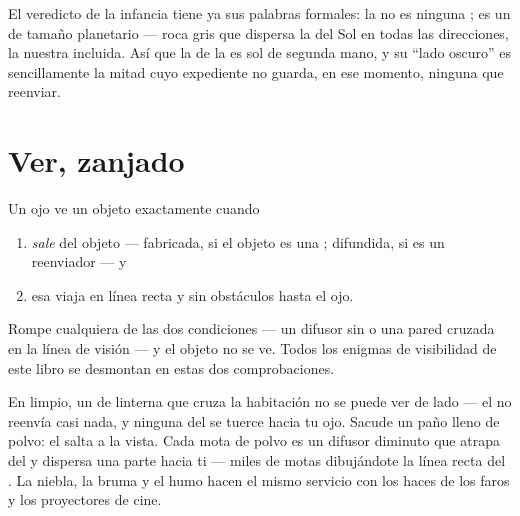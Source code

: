 \begin{example}\label{ex:g7:light-sources-propagation:moon}
El veredicto de la infancia tiene ya sus palabras formales: la
 no es ninguna ; es un
 de tamaño planetario --- roca gris que dispersa la
 del Sol en todas las direcciones, la nuestra incluida. Así que la
 de la  es sol de segunda mano, y su ``lado oscuro'' es
sencillamente la mitad cuyo expediente no guarda, en ese momento,
ninguna  que reenviar.
\end{example}

\section{Ver, zanjado}

\begin{proposition}\label{prop:g7:light-sources-propagation:vision}
Un ojo ve un objeto exactamente cuando
\begin{enumerate}
  \item \emph{sale}  del objeto --- fabricada, si el objeto es
        una ; difundida, si es un reenviador --- y
  \item esa  viaja en línea recta y sin obstáculos hasta el
        ojo.
\end{enumerate}
Rompe cualquiera de las dos condiciones --- un difusor sin  o una
pared cruzada en la línea de visión --- y el objeto no se ve. Todos
los enigmas de visibilidad de este libro se desmontan en estas dos
comprobaciones.
\end{proposition}

\begin{example}\label{ex:g7:light-sources-propagation:beam}
En  limpio, un  de linterna que cruza la habitación no
se puede ver de lado --- el  no reenvía casi nada, y ninguna
 del  se tuerce hacia tu ojo. Sacude un paño lleno de
polvo: el  salta a la vista. Cada mota de polvo es un difusor
diminuto que atrapa  del  y dispersa una parte hacia ti ---
miles de motas dibujándote la línea recta del . La niebla, la
bruma y el humo hacen el mismo servicio con los haces de los faros
y los proyectores de cine.
\end{example}

